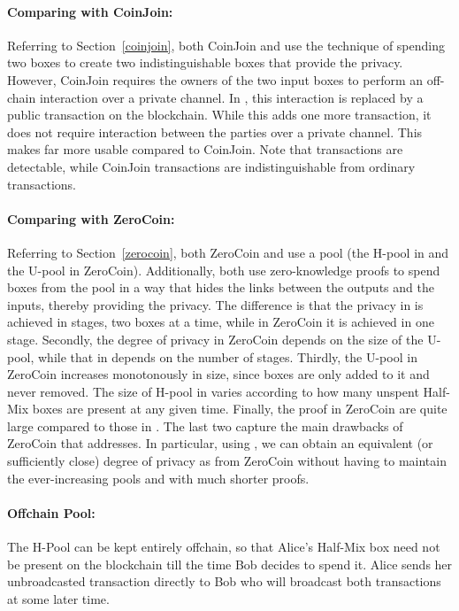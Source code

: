 \documentclass[runningheads]{llncs}
\begin{document}
\paragraph{Comparing with CoinJoin:} Referring to Section~\ref{coinjoin}, both CoinJoin and \algname use the technique of spending two boxes to create two indistinguishable boxes that provide the privacy. However, CoinJoin requires the owners of the two input boxes to perform an off-chain interaction over a private channel. In \algname, this interaction is replaced by a public transaction on the blockchain. While this adds one more transaction, it does not require interaction between the parties over a private channel. This makes \algname far more usable compared to CoinJoin. Note that \algname transactions are detectable, while CoinJoin transactions are indistinguishable from ordinary transactions.

\paragraph{Comparing with ZeroCoin:} Referring to Section~\ref{zerocoin}, both ZeroCoin and \algname use a pool (the H-pool in \algname and the U-pool in ZeroCoin). Additionally, both use zero-knowledge proofs to spend boxes from the pool in a way that hides the links between the outputs and the inputs, thereby providing the privacy. 
The difference is that the privacy in \algname is achieved in stages, two boxes at a time, while in ZeroCoin it is achieved in one stage. Secondly, the degree of privacy in ZeroCoin depends on the size of the U-pool, while that in \algname depends on the number of stages. Thirdly, the U-pool in ZeroCoin increases monotonously in size, since boxes are only added to it and never removed. The size of H-pool in \algname varies according to how many unspent Half-Mix boxes are present at any given time. Finally, the proof in ZeroCoin are quite large compared to those in \algname. The last two capture the main drawbacks of ZeroCoin that \algname addresses.
In particular, using \algname, we can obtain an equivalent (or sufficiently close) degree of privacy as from ZeroCoin without having to maintain the ever-increasing pools and with much shorter proofs. 

\paragraph{Offchain Pool:} The H-Pool can be kept entirely offchain, so that Alice's Half-Mix box need not be present on the blockchain till the time Bob decides to spend it. Alice sends her unbroadcasted transaction directly to Bob who will broadcast both transactions at some later time. 
\end{document}
